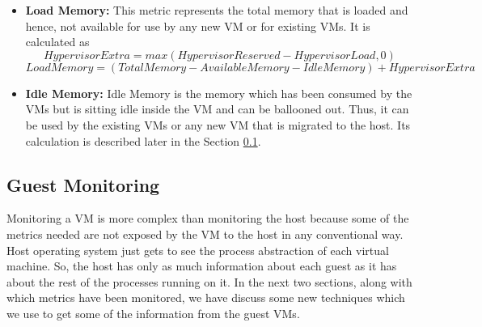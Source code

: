 \begin{itemize}
\item \textbf{Load Memory: } This metric represents the total memory that is loaded and hence, not available for use by any new VM or for existing VMs. It is calculated as
$$ 
Hypervisor Extra = max(Hypervisor Reserved-Hypervisor Load, 0)$$
$$Load Memory = (Total Memory - Available Memory - Idle Memory) + Hypervisor Extra$$

\item \textbf{Idle Memory: } Idle Memory is the memory which has been consumed by the VMs but is sitting idle inside the VM and can be ballooned out. Thus, it can be used by the existing VMs or any new VM that is migrated to the host. Its calculation is described later in the Section \ref{sec:guestmon}.
\end{itemize}

\subsection{Guest Monitoring} \label{sec:guestmon}
Monitoring a VM is more complex than monitoring the host because some of the metrics needed are not exposed by the VM to the host in any conventional way. Host operating system just gets to see the process abstraction of each virtual machine. So, the host has only as much information about each guest as it has about the rest of the processes running on it. In the next two sections, along with which metrics have been monitored, we have discuss some new techniques which we use to get some of the information from the guest VMs.

